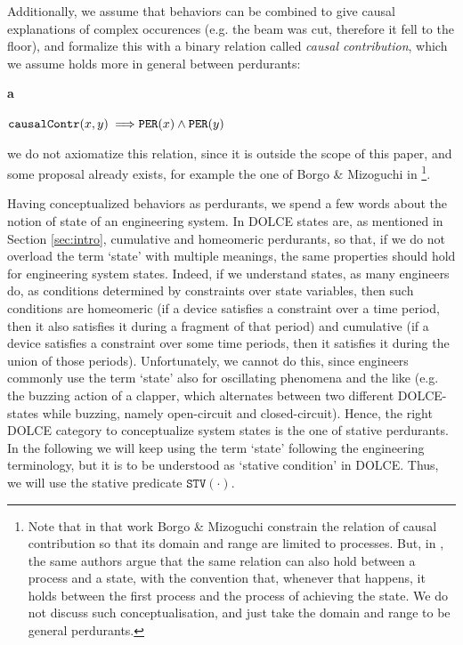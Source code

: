 \documentclass[sw]{iosart2x}
\newcommand{\bflist}{\begin{list}{}{\setlength{\topsep}{2mm}\setlength{\partopsep}{0mm}\setlength{\parsep}{0mm}\setlength{\leftmargin}{9mm}\setlength{\labelwidth}{8mm}}}
\newcommand{\eflist}{\end{list}}
\newcommand{\AxLabel}{\textrm{a}}
\newcounter{cntax}
\newcommand{\myax}[1]{\refstepcounter{cntax}\begin{small}{\bf \AxLabel\thecntax\label{ax:#1}}\end{small}}
\newcommand{\generalStyle}[1]{\texttt{#1}}
\newcommand{\biRel}[3]{\generalStyle{#1}(#2,#3)}
\newcommand{\uniRel}[2]{\generalStyle{#1}(#2)}
\newcommand{\myfi}{\hspace{0.9mm} \Longrightarrow}
\newcommand{\DOLCE}{\textsc{DOLCE}\xspace} %
\newcommand{\DOLCEPerdurant}[1]{\uniRel{{PER}}{#1}}
\newcommand{\DOLCEStative}[1]{\uniRel{{STV}}{#1}}
\newcommand{\causallyContr}[2]{\biRel{causalContr}{#1}{#2}}
\newcommand{\firstTimeKeyWord}[1]{\textit{#1}}
\newcommand{\quotes}[1]{`#1'}
\begin{document}
Additionally, we assume that behaviors can be combined to give causal explanations of complex occurences (e.g. the beam was cut, therefore it fell to the floor), and formalize this with a binary relation called \firstTimeKeyWord{causal contribution}, which we assume holds more in general between perdurants:
\bflist
  \item[\myax{contribRange}] $ \causallyContr{x}{y} \myfi \DOLCEPerdurant{x} \land \DOLCEPerdurant{y} $
\eflist
we do not axiomatize this relation, since it is outside the scope of this paper, and some proposal already exists, for example the one of Borgo \& Mizoguchi in \cite{borgoFirstorderFormalizationEvent2014}\footnote{Note that in that work Borgo \& Mizoguchi constrain the relation of causal contribution so that its domain and range are limited to processes. But, in \cite{mizoguchiUnifyingDefinitionArtifact2016}, the same authors argue that the same relation can also hold between a process and a state, with the convention that, whenever that happens, it holds between the first process and the process of achieving the state.
We do not discuss such conceptualisation, and just take the domain and range to be general perdurants.}.

Having conceptualized behaviors as perdurants, we spend a few words about the notion of state of an engineering system.
In \DOLCE states are, as mentioned in Section \ref{sec:intro}, cumulative and homeomeric perdurants, so that, if we do not overload the term \quotes{state} with multiple meanings, the same properties should hold for engineering system states.
Indeed, if we understand states, as many engineers do, as conditions determined by constraints over state variables, then such conditions are homeomeric (if a device satisfies a constraint over a time period, then it also satisfies it during a fragment of that period) and cumulative (if a device satisfies a constraint over some time periods, then it satisfies it during the union of those periods).
Unfortunately, we cannot do this, since engineers commonly use the term \quotes{state} also for oscillating phenomena and the like (e.g. the buzzing action of a clapper, which alternates between two different \DOLCE-states while buzzing, namely open-circuit and closed-circuit). 
Hence, the right \DOLCE category to conceptualize system states is the one of stative perdurants. 
In the following we will keep using the term \quotes{state} following the engineering terminology, but it is to be understood as \quotes{stative condition} in \DOLCE. Thus, we will use the stative predicate $\DOLCEStative{\cdot}$.
\end{document}
